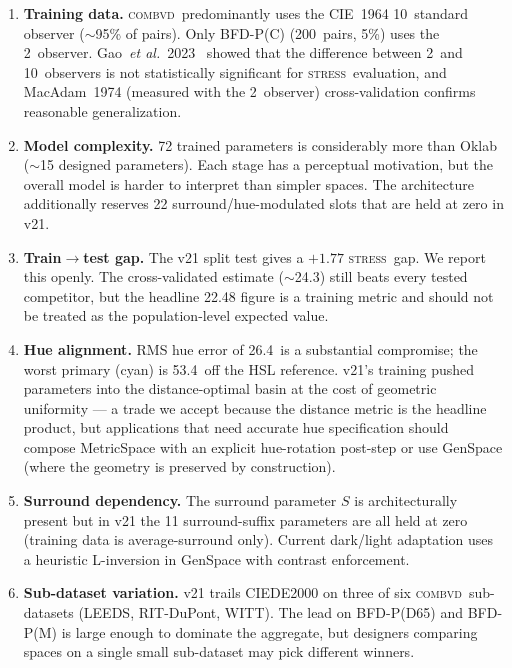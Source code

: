 \documentclass[11pt, twocolumn]{article}
\newcommand{\stress}{\textsc{stress}}
\newcommand{\combvd}{\textsc{combvd}}
\newcommand{\etal}{\textit{et al.}}
\begin{document}
\begin{enumerate}
  \item \textbf{Training data.} \combvd\ predominantly uses the
    CIE~1964 10\textdegree\ standard observer ($\sim$95\% of pairs).
    Only BFD-P(C) (200~pairs, 5\%) uses the 2\textdegree\ observer.
    Gao~\etal\ 2023~\cite{gao2023} showed that the difference between
    2\textdegree\ and 10\textdegree\ observers is not statistically
    significant for \stress\ evaluation, and MacAdam~1974 (measured
    with the 2\textdegree\ observer) cross-validation confirms
    reasonable generalization.

  \item \textbf{Model complexity.} 72 trained parameters is
    considerably more than Oklab ($\sim$15 designed parameters).
    Each stage has a perceptual motivation, but the overall model
    is harder to interpret than simpler spaces. The architecture
    additionally reserves 22 surround/hue-modulated slots that are
    held at zero in v21.

  \item \textbf{Train$\to$test gap.} The v21 split test gives a
    $+1.77$ \stress\ gap. We report this openly. The cross-validated
    estimate ($\sim$24.3) still beats every tested competitor, but
    the headline 22.48 figure is a training metric and should not
    be treated as the population-level expected value.

  \item \textbf{Hue alignment.} RMS hue error of 26.4\textdegree\
    is a substantial compromise; the worst primary (cyan) is
    53.4\textdegree\ off the HSL reference. v21's training pushed
    parameters into the distance-optimal basin at the cost of
    geometric uniformity --- a trade we accept because the
    distance metric is the headline product, but applications
    that need accurate hue specification should compose
    MetricSpace with an explicit hue-rotation post-step or use
    GenSpace (where the geometry is preserved by construction).

  \item \textbf{Surround dependency.} The surround parameter $S$ is
    architecturally present but in v21 the 11 surround-suffix
    parameters are all held at zero (training data is
    average-surround only). Current dark/light adaptation uses a
    heuristic L-inversion in GenSpace with contrast enforcement.

  \item \textbf{Sub-dataset variation.} v21 trails CIEDE2000 on three
    of six \combvd\ sub-datasets (LEEDS, RIT-DuPont, WITT). The lead
    on BFD-P(D65) and BFD-P(M) is large enough to dominate the
    aggregate, but designers comparing spaces on a single small
    sub-dataset may pick different winners.


\end{enumerate}
\end{document}
